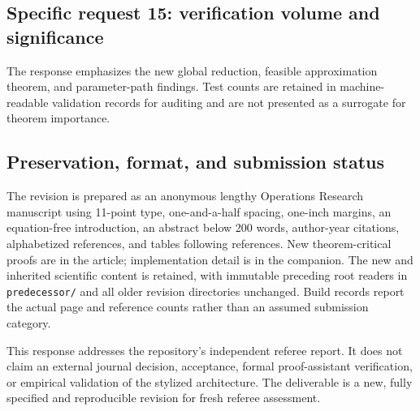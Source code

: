 \documentclass[11pt,letterpaper]{article}
\begin{document}
\subsection*{Specific request 15: verification volume and significance}


The response emphasizes the new global reduction, feasible approximation theorem, and parameter-path findings. Test counts are retained in machine-readable validation records for auditing and are not presented as a surrogate for theorem importance.



\subsection*{Preservation, format, and submission status}


The revision is prepared as an anonymous lengthy Operations Research manuscript using 11-point type, one-and-a-half spacing, one-inch margins, an equation-free introduction, an abstract below 200 words, author-year citations, alphabetized references, and tables following references. New theorem-critical proofs are in the article; implementation detail is in the companion. The new and inherited scientific content is retained, with immutable preceding root readers in \nolinkurl{predecessor/} and all older revision directories unchanged. Build records report the actual page and reference counts rather than an assumed submission category.



This response addresses the repository's independent referee report. It does not claim an external journal decision, acceptance, formal proof-assistant verification, or empirical validation of the stylized architecture. The deliverable is a new, fully specified and reproducible revision for fresh referee assessment.
\end{document}
